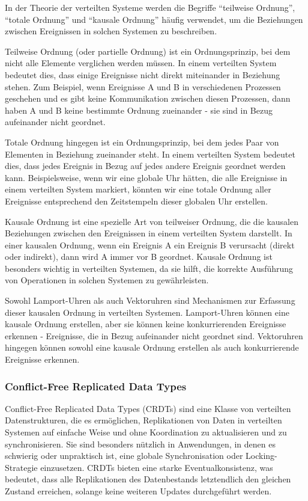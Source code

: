 In der Theorie der verteilten Systeme werden die Begriffe \enquote{teilweise Ordnung}, \enquote{totale Ordnung} und \enquote{kausale Ordnung} häufig verwendet, um die Beziehungen zwischen Ereignissen in solchen Systemen zu beschreiben.

Teilweise Ordnung (oder partielle Ordnung) ist ein Ordnungsprinzip, bei dem nicht alle Elemente verglichen werden müssen. In einem verteilten System bedeutet dies, dass einige Ereignisse nicht direkt miteinander in Beziehung stehen. Zum Beispiel, wenn Ereignisse A und B  in verschiedenen Prozessen geschehen und es gibt keine Kommunikation zwischen diesen Prozessen, dann haben A und B keine bestimmte Ordnung zueinander - sie sind in Bezug aufeinander nicht geordnet.

Totale Ordnung hingegen ist ein Ordnungsprinzip, bei dem jedes Paar von Elementen in Beziehung zueinander steht. In einem verteilten System bedeutet dies, dass jedes Ereignis in Bezug auf jedes andere Ereignis geordnet werden kann. Beispielsweise, wenn wir eine globale Uhr hätten, die alle Ereignisse in einem verteilten System markiert, könnten wir eine totale Ordnung aller Ereignisse entsprechend den Zeitstempeln dieser globalen Uhr erstellen.

Kausale Ordnung ist eine spezielle Art von teilweiser Ordnung, die die kausalen Beziehungen zwischen den Ereignissen in einem verteilten System darstellt. In einer kausalen Ordnung, wenn ein Ereignis A ein Ereignis B verursacht (direkt oder indirekt), dann wird A immer vor B geordnet. Kausale Ordnung ist besonders wichtig in verteilten Systemen, da sie hilft, die korrekte Ausführung von Operationen in solchen Systemen zu gewährleisten.

Sowohl Lamport-Uhren als auch Vektoruhren sind Mechanismen zur Erfassung dieser kausalen Ordnung in verteilten Systemen. Lamport-Uhren können eine kausale Ordnung erstellen, aber sie können keine konkurrierenden Ereignisse erkennen - Ereignisse, die in Bezug aufeinander nicht geordnet sind. Vektoruhren hingegen können sowohl eine kausale Ordnung erstellen als auch konkurrierende Ereignisse erkennen.

\subsubsection{Conflict-Free Replicated Data Types}
Conflict-Free Replicated Data Types (CRDTs) sind eine Klasse von verteilten Datenstrukturen, die es ermöglichen, Replikationen von Daten in verteilten Systemen auf einfache Weise und ohne Koordination zu aktualisieren und zu synchronisieren. Sie sind besonders nützlich in Anwendungen, in denen es schwierig oder unpraktisch ist, eine globale Synchronisation oder Locking-Strategie einzusetzen. CRDTs bieten eine starke Eventualkonsistenz, was bedeutet, dass alle Replikationen des Datenbestands letztendlich den gleichen Zustand erreichen, solange keine weiteren Updates durchgeführt werden.

